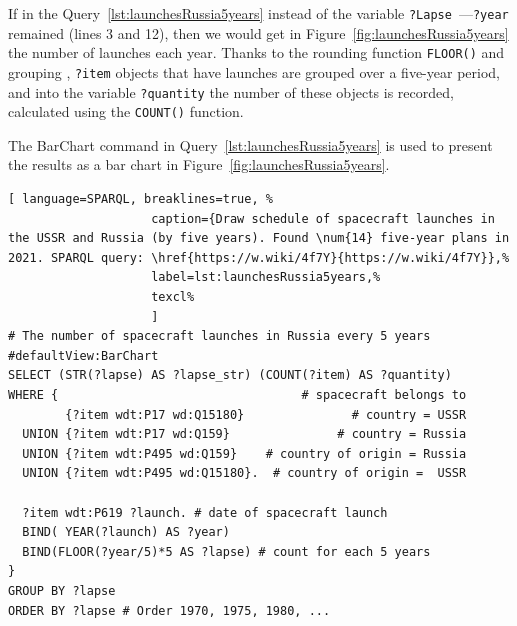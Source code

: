 If in the Query~\ref{lst:launchesRussia5years} instead of the variable \lstinline|?Lapse|~---\lstinline|?year| remained (lines 3 and 12),
then we would get in Figure~\ref{fig:launchesRussia5years}
the number of launches each year.
Thanks to the rounding function \lstinline|FLOOR()|
and grouping%
,
\lstinline|?item| objects that have launches are grouped over a five-year period,
and into the variable \lstinline|?quantity| the number of these objects is recorded,
calculated using the \lstinline|COUNT()| function.

The BarChart command in Query~\ref{lst:launchesRussia5years} is used to present the results as a bar chart in Figure~\ref{fig:launchesRussia5years}.

\begin{lstlisting}[ language=SPARQL, breaklines=true, %
                    caption={Draw schedule of spacecraft launches in the USSR and Russia (by five years). Found \num{14} five-year plans in 2021. SPARQL query: \href{https://w.wiki/4f7Y}{https://w.wiki/4f7Y}},%
                    label=lst:launchesRussia5years,%
                    texcl%
                    ]
# The number of spacecraft launches in Russia every 5 years
#defaultView:BarChart
SELECT (STR(?lapse) AS ?lapse_str) (COUNT(?item) AS ?quantity)
WHERE {                                  # spacecraft belongs to
        {?item wdt:P17 wd:Q15180}               # country = USSR
  UNION {?item wdt:P17 wd:Q159}               # country = Russia
  UNION {?item wdt:P495 wd:Q159}    # country of origin = Russia
  UNION {?item wdt:P495 wd:Q15180}.  # country of origin =  USSR
  
  ?item wdt:P619 ?launch. # date of spacecraft launch
  BIND( YEAR(?launch) AS ?year) 
  BIND(FLOOR(?year/5)*5 AS ?lapse) # count for each 5 years
} 
GROUP BY ?lapse
ORDER BY ?lapse # Order 1970, 1975, 1980, ...
\end{lstlisting}%

